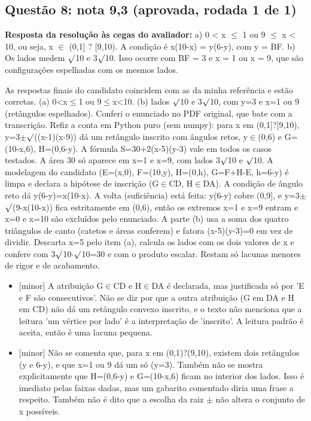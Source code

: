 \documentclass{article}%
\begin{document}
\subsection*{Questão 8: nota 9,3 (aprovada, rodada 1 de 1)}%
\textbf{Resposta da resolução às cegas do avaliador:} a) 0 < x $\leq$ 1 ou 9 $\leq$ x < 10, ou seja, x $\in$ (0,1{]} ? {[}9,10). A condição é x(10-x) = y(6-y), com y = BF.\newline%
b) Os lados medem $\surd$10 e 3$\surd$10. Isso ocorre com BF = 3 e x = 1 ou x = 9, que são configurações espelhadas com os mesmos lados.\par %
As respostas finais do candidato coincidem com as da minha referência e estão corretas. (a) 0<x$\leq$1 ou 9$\leq$x<10. (b) lados $\surd$10 e 3$\surd$10, com y=3 e x=1 ou 9 (retângulos espelhados). Conferi o enunciado no PDF original, que bate com a transcrição. Refiz a conta em Python puro (sem numpy): para x em (0,1{]}?{[}9,10), y=3$\pm$$\surd$((x-1)(x-9)) dá um retângulo inscrito com ângulos retos, y$\in$(0,6) e G=(10-x,6), H=(0,6-y). A fórmula S=30+2(x-5)(y-3) vale em todos os casos testados. A área 30 só aparece em x=1 e x=9, com lados 3$\surd$10 e $\surd$10. A modelagem do candidato (E=(x,0), F=(10,y), H=(0,h), G=F+H-E, h=6-y) é limpa e declara a hipótese de inscrição (G$\in$CD, H$\in$DA). A condição de ângulo reto dá y(6-y)=x(10-x). A volta (suficiência) está feita: y(6-y) cobre (0,9{]}, e y=3$\pm$$\surd$(9-x(10-x)) fica estritamente em (0,6), então os extremos x=1 e x=9 entram e x=0 e x=10 são excluídos pelo enunciado. A parte (b) usa a soma dos quatro triângulos de canto (catetos e áreas conferem) e fatora (x-5)(y-3)=0 em vez de dividir. Descarta x=5 pelo item (a), calcula os lados com os dois valores de x e confere com 3$\surd$10$\cdot$$\surd$10=30 e com o produto escalar. Restam só lacunas menores de rigor e de acabamento.%
\begin{itemize}%
\item%
{[}minor{]} A atribuição G$\in$CD e H$\in$DA é declarada, mas justificada só por 'E e F são consecutivos'. Não se diz por que a outra atribuição (G em DA e H em CD) não dá um retângulo convexo inscrito, e o texto não menciona que a leitura 'um vértice por lado' é a interpretação de 'inscrito'. A leitura padrão é aceita, então é uma lacuna pequena.%
\item%
{[}minor{]} Não se comenta que, para x em (0,1)?(9,10), existem dois retângulos (y e 6-y), e que x=1 ou 9 dá um só (y=3). Também não se mostra explicitamente que H=(0,6-y) e G=(10-x,6) ficam no interior dos lados. Isso é imediato pelas faixas dadas, mas um gabarito comentado diria uma frase a respeito. Também não é dito que a escolha da raiz $\pm$ não altera o conjunto de x possíveis.%

\end{itemize}$$
\end{document}
